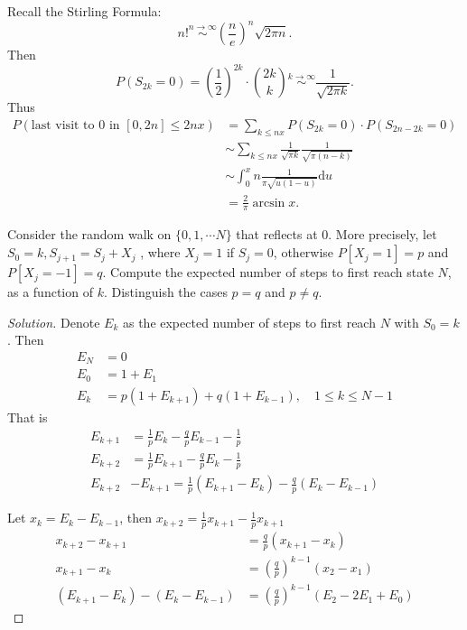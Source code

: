 \documentclass[11pt,singlecolumn, openany, citestyle=authoryear]{elegantbook}
\begin{document}
\begin{CJK}{UTF8}{gbsn}
\begin{remark}
Recall the Stirling Formula:
\begin{equation}
    n! \overset{n\to\infty}{\sim} \left(\frac{n}{e}\right)^n \sqrt{2\pi n}.
\end{equation}
Then 
$$
P(S_{2k}=0)=\left( \frac{1}{2}\right)^{2k} \cdot \binom{2k}{k} \overset{k\to\infty}{\sim}
\frac{1}{\sqrt{2\pi k}}.
$$
Thus 
\begin{align*}
    P(\text{last visit to }0 \text{ in }[0,2n] \leqslant 2nx) &=
    \sum_{k\leqslant nx} P(S_{2k}=0)\cdot P(S_{2n-2k}=0)\\
    &\sim \sum_{k\leqslant nx}\frac{1}{\sqrt{\pi k}}\frac{1}{\sqrt{\pi(n-k)}}\\
    &\sim \int_0^xn \frac{1}{\pi \sqrt{u(1-u)}} \mathrm{d}u \\
    &=\frac{2}{\pi}\arcsin x.
\end{align*}
\end{remark}

\begin{exercise}
    Consider the random walk on $\{0, 1, \cdots N\}$ that reflects at $0$. 
    More precisely, let $S_0 = k, S_{j+1} = S_j + X_j$ , where $X_j = 1$ if 
    $S_j = 0$, otherwise $P [X_j = 1] = p$ and $P [X_j = -1] = q$.
Compute the expected number of steps to first reach state $N$, as a function of $k$.
Distinguish the cases $p = q$ and $p \neq q$.
\end{exercise}
\begin{proof}[Solution]
    Denote $E_k$ as the expected number of steps to first reach $N$ with $S_0=k$. Then
$$
\begin{aligned}
E_N & =0 \\
E_0 & =1+E_1 \\
E_k & =p\left(1+E_{k+1}\right)+q\left(1+E_{k-1}\right), \quad 1 \leq k \leq N-1
\end{aligned}
$$
That is 
$$
\begin{aligned}
E_{k+1} & =\frac{1}{p} E_k-\frac{q}{p} E_{k-1}-\frac{1}{p} \\
E_{k+2} & =\frac{1}{p} E_{k+1}-\frac{q}{p} E_k-\frac{1}{p} \\
E_{k+2} & -E_{k+1}=\frac{1}{p}\left(E_{k+1}-E_k\right)-\frac{q}{p}\left(E_k-E_{k-1}\right)
\end{aligned}
$$

Let $x_k=E_k-E_{k-1}$, then $x_{k+2}=\frac{1}{p} x_{k+1}-\frac{1}{p} x_{k+1}$
$$
\begin{aligned}
x_{k+2}-x_{k+1} & =\frac{q}{p}\left(x_{k+1}-x_k\right) \\
x_{k+1}-x_k & =\left(\frac{q}{p}\right)^{k-1}\left(x_2-x_1\right) \\
\left(E_{k+1}-E_k\right)-\left(E_k-E_{k-1}\right) & =\left(\frac{q}{p}\right)^{k-1}\left(E_2-2 E_1+E_0\right)
\end{aligned}
$$
\end{proof}


\end{CJK}
\end{document}
